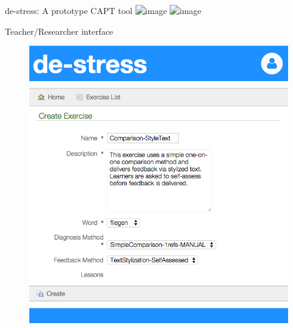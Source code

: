 \documentclass[xcolor={dvipsnames}]{beamer}
\begin{document}
		\begin{frame}{de-stress: A prototype CAPT tool}
		\includegraphics<1>[height=.8\textheight]{hourglass-colloq-noits}
		\includegraphics<2>[height=.8\textheight]{hourglass-colloq-nodashed}
		\end{frame}
		
		\begin{frame}{Teacher/Researcher interface}
		\begin{figure}
		\includegraphics[height=.85\textheight]{../img/screenshots/TeacherInterface-smaller}
		\end{figure}
		\end{frame}
		
\end{document}
